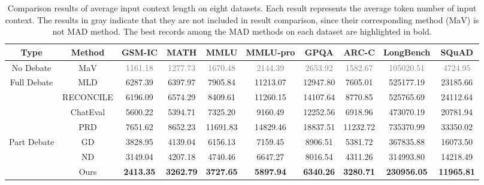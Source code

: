 \begin{table}
\small
  \centering
  \setlength{\tabcolsep}{1mm}
  \renewcommand{\arraystretch}{1.3}
 \begin{tabular}{c|c|cccccccc}
\toprule
Type    &Method              & GSM-IC           & MATH             & MMLU             & MMLU-pro         & GPQA             & ARC-C    & LongBench          & SQuAD             \\ \midrule
No Debate   & MaV                 & \textcolor{gray}{1161.18}          & \textcolor{gray}{1277.73}          & \textcolor{gray}{1670.48}          & \textcolor{gray}{2144.39}          & \textcolor{gray}{2653.92}          & \textcolor{gray}{1582.67}          & \textcolor{gray}{105020.51}          & \textcolor{gray}{4724.95}           \\   \midrule
\multirow{4}{*}{Full Debate}   & MLD                 & 6287.39          & 6397.97          & 7905.84          & 11213.07         & 12947.80         & 7605.01          & 525177.19          & 23185.66          \\
& RECONCILE           & 6196.09          & 6574.29          & 8409.61          & 11260.15         & 14107.64         & 8770.85          & 525765.69          & 24112.64          \\
& ChatEval            & 5600.22          & 5394.71          & 7325.20          & 9160.49          & 12252.56         & 6918.96          & 473070.19          & 20781.94          \\
& PRD                 & 7651.62          & 8652.23          & 11691.83         & 14829.46         & 18837.51         & 11232.72         & 735370.99          & 33350.02          \\  \midrule
\multirow{3}{*}{Part Debate}   & GD         & 3828.95          & 4139.04          & 6156.13          & 7159.45          & 8906.51          & 5381.72          & 367835.88          & 16073.50          \\
& ND                  & 3149.04          & 4207.18          & 4740.46          & 6647.27          & 8016.54          & 4311.26          & 314993.80          & 14218.49          \\  \cmidrule{2-10}
& Ours & \textbf{2413.35} & \textbf{3262.79} & \textbf{3727.65} & \textbf{5897.94} & \textbf{6340.26} & \textbf{3280.71} & \textbf{230956.05} & \textbf{11965.81} \\ \bottomrule
\end{tabular}
  \caption{\label{appendix_result_token}
   Comparison results of average input context length on eight datasets. Each result represents the average token number of input context. The results in gray indicate that they are not included in result comparison, since their corresponding method (MaV) is not MAD method. The best records among the MAD methods on each dataset are highlighted in bold.
  }
\end{table}